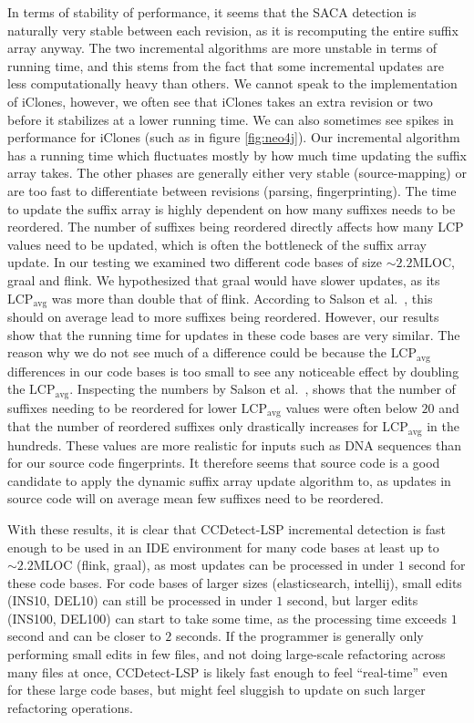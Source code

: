 In terms of stability of performance, it seems that the SACA detection is naturally very
stable between each revision, as it is recomputing the entire suffix array anyway. The two
incremental algorithms are more unstable in terms of running time, and this stems from the
fact that some incremental updates are less computationally heavy than others. We cannot
speak to the implementation of iClones, however, we often see that iClones takes an extra
revision or two before it stabilizes at a lower running time. We can also sometimes see
spikes in performance for iClones (such as in figure \ref{fig:neo4j}). Our incremental
algorithm has a running time which fluctuates mostly by how much time updating the suffix
array takes. The other phases are generally either very stable (source-mapping) or are too
fast to differentiate between revisions (parsing, fingerprinting). The time to update the
suffix array is highly dependent on how many suffixes needs to be reordered. The number of
suffixes being reordered directly affects how many LCP values need to be updated, which is
often the bottleneck of the suffix array update. In our testing we examined two different
code bases of size ${\sim}2.2\text{MLOC}$, graal and flink. We hypothesized that graal
would have slower updates, as its $\text{LCP}_\text{avg}$ was more than double that of
flink. According to Salson et al.~\cite{DynamicExtendedSuffixArraysReorderings}, this
should on average lead to more suffixes being reordered. However, our results show that
the running time for updates in these code bases are very similar. The reason why we do
not see much of a difference could be because the $\text{LCP}_\text{avg}$ differences in
our code bases is too small to see any noticeable effect by doubling the
$\text{LCP}_\text{avg}$. Inspecting the numbers by Salson et
al.~\cite{DynamicExtendedSuffixArraysReorderings}, shows that the number of suffixes
needing to be reordered for lower $\text{LCP}_\text{avg}$ values were often below $20$ and
that the number of reordered suffixes only drastically increases for
$\text{LCP}_\text{avg}$ in the hundreds. These values are more realistic for inputs such
as DNA sequences than for our source code fingerprints. It therefore seems that source
code is a good candidate to apply the dynamic suffix array update algorithm to, as updates
in source code will on average mean few suffixes need to be reordered.

With these results, it is clear that CCDetect-LSP incremental detection is fast enough to
be used in an IDE environment for many code bases at least up to ${\sim}2.2$MLOC (flink,
graal), as most updates can be processed in under $1$ second for these code bases. For
code bases of larger sizes (elasticsearch, intellij), small edits (INS10, DEL10) can still
be processed in under $1$ second, but larger edits (INS100, DEL100) can start to take some
time, as the processing time exceeds $1$ second and can be closer to $2$ seconds. If the
programmer is generally only performing small edits in few files, and not doing
large-scale refactoring across many files at once, CCDetect-LSP is likely fast enough to
feel ``real-time'' even for these large code bases, but might feel sluggish to update on
such larger refactoring operations.

